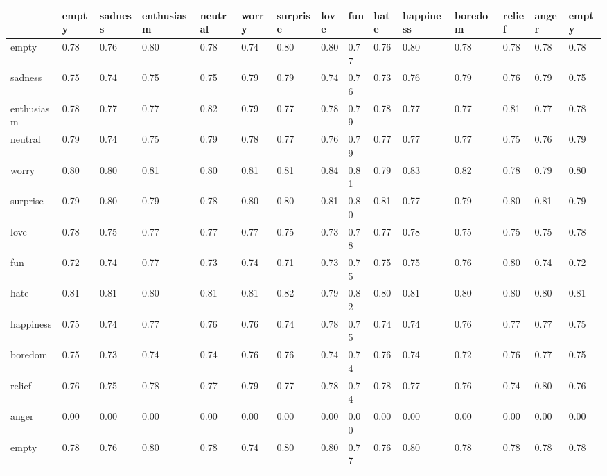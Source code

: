 \begin{tabular}{lllllllllllllll}
\toprule
 & empty & sadness & enthusiasm & neutral & worry & surprise & love & fun & hate & happiness & boredom & relief & anger & empty \\
\midrule
empty & 0.78 & 0.76 & 0.80 & 0.78 & 0.74 & 0.80 & 0.80 & 0.77 & 0.76 & 0.80 & 0.78 & 0.78 & 0.78 & 0.78 \\
sadness & 0.75 & 0.74 & 0.75 & 0.75 & 0.79 & 0.79 & 0.74 & 0.76 & 0.73 & 0.76 & 0.79 & 0.76 & 0.79 & 0.75 \\
enthusiasm & 0.78 & 0.77 & 0.77 & 0.82 & 0.79 & 0.77 & 0.78 & 0.79 & 0.78 & 0.77 & 0.77 & 0.81 & 0.77 & 0.78 \\
neutral & 0.79 & 0.74 & 0.75 & 0.79 & 0.78 & 0.77 & 0.76 & 0.79 & 0.77 & 0.77 & 0.77 & 0.75 & 0.76 & 0.79 \\
worry & 0.80 & 0.80 & 0.81 & 0.80 & 0.81 & 0.81 & 0.84 & 0.81 & 0.79 & 0.83 & 0.82 & 0.78 & 0.79 & 0.80 \\
surprise & 0.79 & 0.80 & 0.79 & 0.78 & 0.80 & 0.80 & 0.81 & 0.80 & 0.81 & 0.77 & 0.79 & 0.80 & 0.81 & 0.79 \\
love & 0.78 & 0.75 & 0.77 & 0.77 & 0.77 & 0.75 & 0.73 & 0.78 & 0.77 & 0.78 & 0.75 & 0.75 & 0.75 & 0.78 \\
fun & 0.72 & 0.74 & 0.77 & 0.73 & 0.74 & 0.71 & 0.73 & 0.75 & 0.75 & 0.75 & 0.76 & 0.80 & 0.74 & 0.72 \\
hate & 0.81 & 0.81 & 0.80 & 0.81 & 0.81 & 0.82 & 0.79 & 0.82 & 0.80 & 0.81 & 0.80 & 0.80 & 0.80 & 0.81 \\
happiness & 0.75 & 0.74 & 0.77 & 0.76 & 0.76 & 0.74 & 0.78 & 0.75 & 0.74 & 0.74 & 0.76 & 0.77 & 0.77 & 0.75 \\
boredom & 0.75 & 0.73 & 0.74 & 0.74 & 0.76 & 0.76 & 0.74 & 0.74 & 0.76 & 0.74 & 0.72 & 0.76 & 0.77 & 0.75 \\
relief & 0.76 & 0.75 & 0.78 & 0.77 & 0.79 & 0.77 & 0.78 & 0.74 & 0.78 & 0.77 & 0.76 & 0.74 & 0.80 & 0.76 \\
anger & 0.00 & 0.00 & 0.00 & 0.00 & 0.00 & 0.00 & 0.00 & 0.00 & 0.00 & 0.00 & 0.00 & 0.00 & 0.00 & 0.00 \\
empty & 0.78 & 0.76 & 0.80 & 0.78 & 0.74 & 0.80 & 0.80 & 0.77 & 0.76 & 0.80 & 0.78 & 0.78 & 0.78 & 0.78 \\
\bottomrule
\end{tabular}
